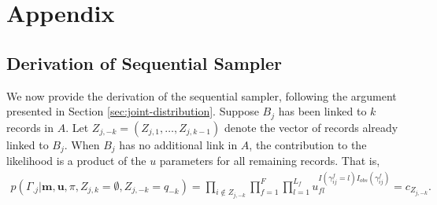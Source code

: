 \documentclass[12pt,letterpaper]{article}
\newcommand{\1}[1]{\mathbb{I}\!\left[#1\right]} %
\begin{document}
\section{Appendix}
\label{sec:appendix}

\subsection{Derivation of Sequential Sampler}\label{app:sequential-sampler}
We now provide the derivation of the sequential sampler, following the argument presented in Section \ref{sec:joint-distribution}. Suppose $B_j$ has been linked to $k$ records in $A$. Let $Z_{j, -k} = (Z_{j, 1}, \ldots, Z_{j, k-1})$ denote the vector of records already linked to $B_j$. When $B_j$ has no additional link in $A$, the contribution to the likelihood is a product of the $u$ parameters for all remaining records. That is, 
\begin{align}
	p(\Gamma_{.j}| \bm{m}, \bm{u}, \pi, Z_{j, k} = \emptyset, Z_{j, -k} = q_{-k}) = \prod_{i \notin Z_{j, -k}} \prod_{f=1}^{F}\prod_{l=1}^{L_f} u_{fl}^{I(\gamma_{ij}^f = l)I_{obs}(\gamma_{ij}^f)} = c_{Z_{j, -k}}.
\end{align}
\end{document}
